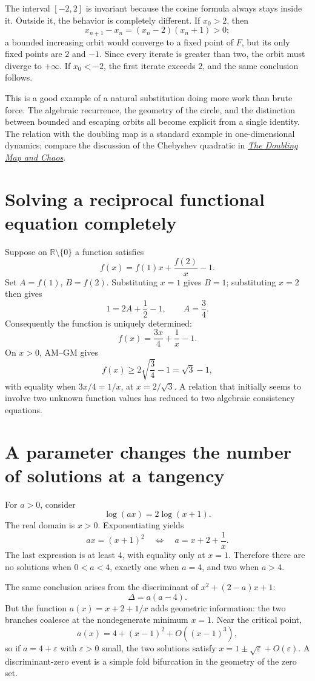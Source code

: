 The interval $[-2,2]$ is invariant because the cosine formula always stays inside it. Outside it, the behavior is completely different. If $x_0>2$, then
\[
 x_{n+1}-x_n=(x_n-2)(x_n+1)>0;
\]
a bounded increasing orbit would converge to a fixed point of $F$, but its only fixed points are $2$ and $-1$. Since every iterate is greater than two, the orbit must diverge to $+\infty$. If $x_0<-2$, the first iterate exceeds $2$, and the same conclusion follows.

This is a good example of a natural substitution doing more work than brute force. The algebraic recurrence, the geometry of the circle, and the distinction between bounded and escaping orbits all become explicit from a single identity. The relation with the doubling map is a standard example in one-dimensional dynamics; compare the discussion of the Chebyshev quadratic in \href{https://marksmath.org/classes/Fall2017ChaosAndFractals/chaos_and_fractals/section-chaos_and_doubling.html}{\emph{The Doubling Map and Chaos}}.

\section{Solving a reciprocal functional equation completely}

Suppose on \(\mathbb R\setminus\{0\}\) a function satisfies
\[
 f(x)=f(1)x+\frac{f(2)}x-1.
\]
Set \(A=f(1)\), \(B=f(2)\). Substituting \(x=1\) gives \(B=1\); substituting \(x=2\) then gives
\[
 1=2A+\frac12-1,\qquad A=\frac34.
\]
Consequently the function is uniquely determined:
\[
 \boxed{f(x)=\frac{3x}{4}+\frac1x-1.}
\]
On \(x>0\), AM--GM gives
\[
 f(x)\ge2\sqrt{\frac34}-1=\sqrt3-1,
\]
with equality when \(3x/4=1/x\), at \(x=2/\sqrt3\). A relation that initially seems to involve two unknown function values has reduced to two algebraic consistency equations.

\section{A parameter changes the number of solutions at a tangency}

For \(a>0\), consider
\[
 \log(ax)=2\log(x+1).
\]
The real domain is \(x>0\). Exponentiating yields
\[
 ax=(x+1)^2
 \quad\Longleftrightarrow\quad
 a=x+2+\frac1x.
\]
The last expression is at least \(4\), with equality only at \(x=1\). Therefore there are no solutions when \(0<a<4\), exactly one when \(a=4\), and two when \(a>4\).

The same conclusion arises from the discriminant of \(x^2+(2-a)x+1\):
\[
 \Delta=a(a-4).
\]
But the function \(a(x)=x+2+1/x\) adds geometric information: the two branches coalesce at the nondegenerate minimum \(x=1\). Near the critical point,
\[
 a(x)=4+(x-1)^2+O((x-1)^3),
\]
so if \(a=4+\varepsilon\) with \(\varepsilon>0\) small, the two solutions satisfy
\(x=1\pm\sqrt\varepsilon+O(\varepsilon)\). A discriminant-zero event is a simple fold bifurcation in the geometry of the zero set.

